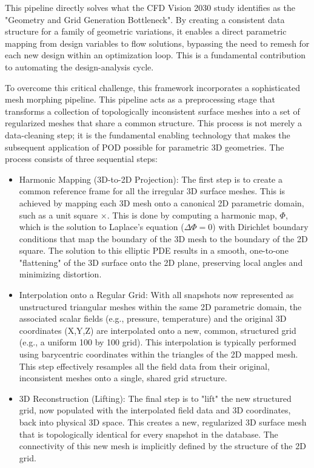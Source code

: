 \documentclass[dsc, EN]{ufabcFHZh}
\begin{document}
{This pipeline directly solves what the CFD Vision 2030 study identifies as the "Geometry and Grid Generation Bottleneck". By creating a consistent data structure for a family of geometric variations, it enables a direct parametric mapping from design variables to flow solutions, bypassing the need to remesh for each new design within an optimization loop. This is a fundamental contribution to automating the design-analysis cycle.   

To overcome this critical challenge, this framework incorporates a sophisticated mesh morphing pipeline. This pipeline acts as a preprocessing stage that transforms a collection of topologically inconsistent surface meshes into a set of regularized meshes that share a common structure. This process is not merely a data-cleaning step; it is the fundamental enabling technology that makes the subsequent application of POD possible for parametric 3D geometries. The process consists of three sequential steps:

\begin{itemize}
    \item Harmonic Mapping (3D-to-2D Projection): The first step is to create a common reference frame for all the irregular 3D surface meshes. This is achieved by mapping each 3D mesh onto a canonical 2D parametric domain, such as a unit square $ \times $. This is done by computing a harmonic map, $\Phi$, which is the solution to Laplace's equation ($\Delta\Phi=0$) with Dirichlet boundary conditions that map the boundary of the 3D mesh to the boundary of the 2D square. The solution to this elliptic PDE results in a smooth, one-to-one "flattening" of the 3D surface onto the 2D plane, preserving local angles and minimizing distortion. 

    \item Interpolation onto a Regular Grid: With all snapshots now represented as unstructured triangular meshes within the same 2D parametric domain, the associated scalar fields (e.g., pressure, temperature) and the original 3D coordinates (X,Y,Z) are interpolated onto a new, common, structured grid (e.g., a uniform 100 by 100 grid). This interpolation is typically performed using barycentric coordinates within the triangles of the 2D mapped mesh. This step effectively resamples all the field data from their original, inconsistent meshes onto a single, shared grid structure. 
    

    \item 3D Reconstruction (Lifting): The final step is to "lift" the new structured grid, now populated with the interpolated field data and 3D coordinates, back into physical 3D space. This creates a new, regularized 3D surface mesh that is topologically identical for every snapshot in the database. The connectivity of this new mesh is implicitly defined by the structure of the 2D grid. 
\end{itemize}

}
\end{document}
